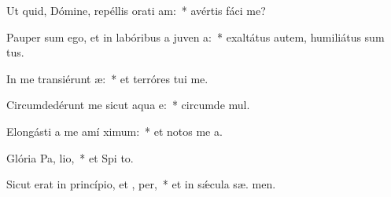 \item Ut quid, Dómine, repéllis orati am:~* avértis fáci   me?
\item Pauper sum ego, et in labóribus a juven a:~* exaltátus autem, humiliátus sum  tus.
\item In me transiérunt  æ:~* et terróres tui  me.
\item Circumdedérunt me sicut aqua  e:~* circumde  mul.
\item Elongásti a me amí  ximum:~* et notos me  a.
\item Glória Pa,  lio,~* et Spi to.
\item Sicut erat in princípio, et ,  per,~* et in sǽcula sæ. men.
